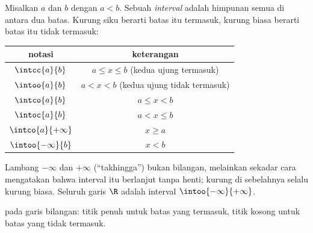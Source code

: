 \begin{definition}[Interval]\label{def:g10:numbers:interval}
Misalkan $a$ dan $b$  dengan $a < b$. Sebuah
\emph{interval} adalah himpunan semua  di antara
dua batas. Kurung siku berarti batas itu termasuk, kurung biasa berarti batas
itu tidak termasuk:
\begin{center}
\begin{tabular}{c|c}
notasi & keterangan \\
\hline
$\intcc{a}{b}$ & $a \leq x \leq b$ (kedua ujung termasuk) \\
$\intoo{a}{b}$ & $a < x < b$ (kedua ujung tidak termasuk) \\
$\intco{a}{b}$ & $a \leq x < b$ \\
$\intoc{a}{b}$ & $a < x \leq b$ \\
$\intco{a}{+\infty}$ & $x \geq a$ \\
$\intoo{-\infty}{b}$ & $x < b$ \\
\end{tabular}
\end{center}
Lambang $-\infty$ dan $+\infty$ (``takhingga'') bukan bilangan, melainkan
sekadar cara mengatakan bahwa interval itu berlanjut tanpa henti; kurung di
sebelahnya selalu kurung biasa. Seluruh garis $\R$ adalah interval
$\intoo{-\infty}{+\infty}$.
\end{definition}

\begin{omfigure}

{\small {} pada garis bilangan: titik penuh untuk batas yang termasuk,
titik kosong untuk batas yang tidak termasuk.}
\end{omfigure}

